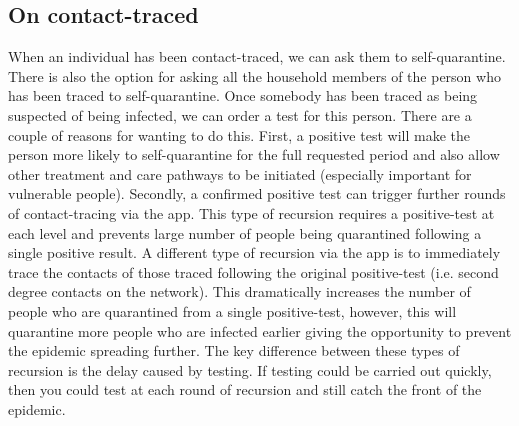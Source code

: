 \documentclass[12pt, oneside]{amsart}   	%
\begin{document}
\subsection{On contact-traced} 
When an individual has been contact-traced, we can ask them to self-quarantine.
There is also the option for asking all the household members of the person who has been traced to self-quarantine.
Once somebody has been traced as being suspected of being infected, we can order a test for this person. 
There are a couple of reasons for wanting to do this. 
First, a positive test will make the person more likely to self-quarantine for the full requested period and also allow other treatment and care pathways to be initiated (especially important for vulnerable people).
Secondly, a confirmed positive test can trigger further rounds of contact-tracing via the app.
This type of recursion requires a positive-test at each level and prevents large number of people being  quarantined following a single positive result.
A different type of recursion via the app is to immediately trace the contacts of those traced following the original positive-test (i.e. second degree contacts on the network). 
This dramatically increases the number of people who are quarantined from a single positive-test, however, this will quarantine more people who are infected earlier giving the opportunity to prevent the epidemic spreading further.
The key difference between these types of recursion is the delay caused by testing. 
If testing could be carried out quickly, then you could test at each round of recursion and still catch the front of the epidemic.
\end{document}
